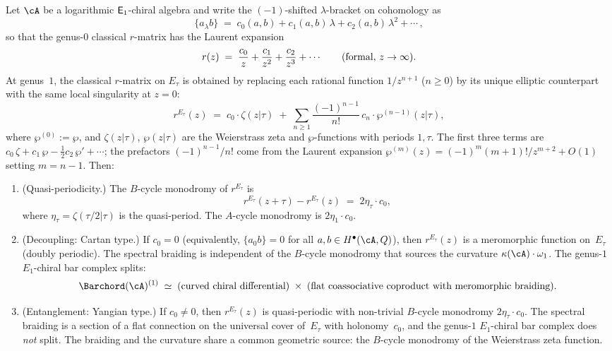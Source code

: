 \begin{theorem}
\label{thm:curvature-braiding-dichotomy}
Let $\cA$ be a logarithmic $\mathsf{E}_1$-chiral algebra and
write the $(-1)$-shifted $\lambda$-bracket on cohomology as
\[
\{a {}_\lambda b\}
\;=\;
c_0(a,b) + c_1(a,b)\,\lambda + c_2(a,b)\,\lambda^2 + \cdots\,,
\]
so that the genus-$0$ classical $r$-matrix has the Laurent
expansion
\[
r(z)
\;=\;
\frac{c_0}{z} + \frac{c_1}{z^2} + \frac{c_2}{z^3} + \cdots
\qquad \text{\textup{(}formal, $z\to\infty$\textup{)}}.
\]
At genus~$1$, the classical $r$-matrix on $E_\tau$ is
obtained by replacing each rational function $1/z^{n+1}$
\textup{(}$n\ge0$\textup{)} by its unique elliptic
counterpart with the same local singularity at $z=0$:
\begin{equation}\label{eq:elliptic-r-matrix}
r^{E_\tau}(z)
\;=\;
c_0\cdot\zeta(z|\tau)
\;+\;
\sum_{n\ge 1}
 \frac{(-1)^{n-1}}{n!}\,
 c_n\cdot\wp^{(n-1)}(z|\tau),
\end{equation}
where $\wp^{(0)}:=\wp$, and $\zeta(z|\tau)$, $\wp(z|\tau)$
are the Weierstrass zeta and $\wp$-functions with periods
$1,\tau$. The first three terms are
$c_0\,\zeta+c_1\,\wp-\tfrac{1}{2}c_2\,\wp'+\cdots$; the
prefactors $(-1)^{n-1}/n!$ come from the Laurent expansion
$\wp^{(m)}(z)=(-1)^m(m+1)!/z^{m+2}+O(1)$ setting $m=n-1$.
Then:
\begin{enumerate}[label=\textup{(\alph*)}]
\item \textup{(Quasi-periodicity.)}
The $B$-cycle monodromy of $r^{E_\tau}$ is
\begin{equation}\label{eq:r-monodromy}
r^{E_\tau}(z+\tau)-r^{E_\tau}(z)
\;=\;
2\eta_\tau\cdot c_0,
\end{equation}
where $\eta_\tau=\zeta(\tau/2|\tau)$ is the quasi-period.
The $A$-cycle monodromy is $2\eta_1\cdot c_0$.

\item \textup{(Decoupling: Cartan type.)}
If $c_0=0$ \textup{(}equivalently, $\{a{}_0 b\}=0$ for all
$a,b\in H^\bullet(\cA,Q)$\textup{)}, then $r^{E_\tau}(z)$
is a meromorphic function on~$E_\tau$
\textup{(}doubly periodic\textup{)}.
The spectral braiding is independent of the $B$-cycle
monodromy that sources the curvature
$\kappa(\cA)\cdot\omega_1$. The genus-$1$ $E_1$-chiral
bar complex splits:
\[
\Barchord(\cA)^{(1)}
\;\simeq\;
(\text{curved chiral differential})
\;\times\;
(\text{flat coassociative coproduct with meromorphic braiding}).
\]

\item \textup{(Entanglement: Yangian type.)}
If $c_0\ne 0$, then $r^{E_\tau}(z)$ is quasi-periodic
with non-trivial $B$-cycle monodromy
$2\eta_\tau\cdot c_0$. The spectral braiding is a
section of a flat connection on the universal cover
of~$E_\tau$ with holonomy~$c_0$, and the genus-$1$
$E_1$-chiral bar complex does \emph{not} split.
The braiding and the curvature share a common geometric
source: the $B$-cycle monodromy of the Weierstrass zeta
function.
\end{enumerate}
\end{theorem}

